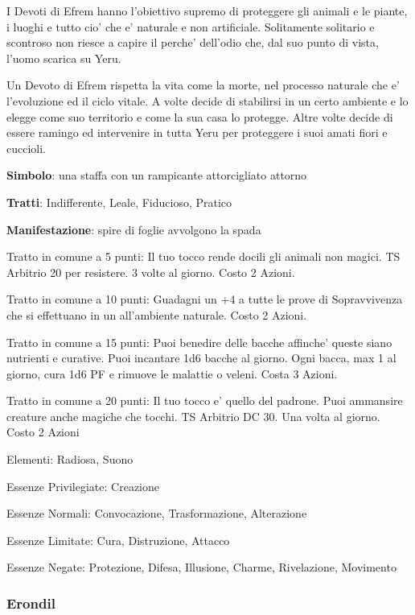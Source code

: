 \documentclass[a4paper,11pt,twoside,openany]{book}
\begin{document}
{I Devoti di Efrem hanno l'obiettivo supremo di proteggere gli animali e le piante, i luoghi e tutto cio' che e' naturale e non artificiale. Solitamente solitario e scontroso non riesce a capire il perche' dell'odio che, dal suo punto di vista, l'uomo scarica su Yeru.

Un Devoto di Efrem rispetta la vita come la morte, nel processo naturale che e' l'evoluzione ed il ciclo vitale. A volte decide di stabilirsi in un certo ambiente e lo elegge come suo territorio e come la sua casa lo protegge. Altre volte decide di essere ramingo ed intervenire in tutta Yeru per proteggere i suoi amati fiori e cuccioli.

\textbf{Simbolo}: una staffa con un rampicante attorcigliato attorno

\textbf{Tratti}: Indifferente, Leale, Fiducioso, Pratico

\textbf{Manifestazione}: spire di foglie avvolgono la spada

\bigskip

Tratto in comune a 5 punti: Il tuo tocco rende docili gli animali non magici. TS Arbitrio 20 per resistere. 3 volte al giorno. Costo 2 Azioni.

Tratto in comune a 10 punti: Guadagni un +4 a tutte le prove di Sopravvivenza che si effettuano in un all'ambiente naturale. Costo 2 Azioni.

Tratto in comune a 15 punti: Puoi benedire delle bacche affinche' queste siano nutrienti e curative. Puoi incantare 1d6 bacche al giorno. Ogni bacca, max 1 al giorno, cura 1d6 PF e rimuove le malattie o veleni. Costa 3 Azioni.

Tratto in comune a 20 punti: Il tuo tocco e' quello del padrone. Puoi ammansire creature anche magiche che tocchi. TS Arbitrio DC 30. Una volta al giorno. Costo 2 Azioni

\bigskip

Elementi: Radiosa, Suono

\bigskip

Essenze Privilegiate: Creazione

Essenze Normali: Convocazione, Trasformazione, Alterazione

Essenze Limitate: Cura, Distruzione, Attacco

Essenze Negate: Protezione, Difesa, Illusione, Charme, Rivelazione, Movimento

\subsubsection{Erondil}

}
\end{document}
